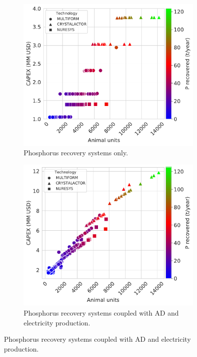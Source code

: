 \begin{refsection}[referencesCh4]
\begin{figure}[h!]
	\centering
	\begin{subfigure}[t]{0.7\linewidth}
		\centering
		\includegraphics[width=\linewidth]{gfx/Chapter4/Capital_TechSelected_Pcredits22_REC0.pdf} 
		\caption{Phosphorus recovery systems only.}
		\label{fig:Capital_TechSelected_Pcredits22_REC0}
	\end{subfigure}
	
	\begin{subfigure}[t]{0.7\linewidth}
		\centering
		\includegraphics[width=\linewidth]{gfx/Chapter4/Capital_TechSelected_Pcredits22_REC60.pdf}
		\caption{Phosphorus recovery systems coupled with AD and electricity production.}
		\label{fig:Capital_TechSelected_Pcredits22_REC60}
	\end{subfigure}
	

\end{figure}
\end{refsection}
